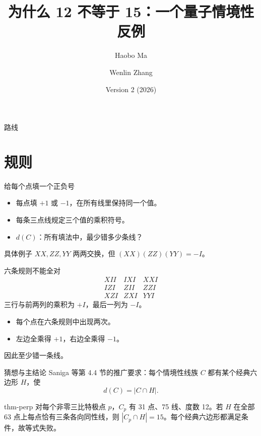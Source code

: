 \documentclass{beamer}
\title{为什么 12 不等于 15：一个量子情境性反例}
\author{Haobo Ma \and Wenlin Zhang}
\date{Version 2 (2026)}
\begin{document}
\begin{frame}
\titlepage
{}
\end{frame}
\begin{frame}{路线}
\tableofcontents
{}
\end{frame}
\section{规则}
\begin{frame}{给每个点填一个正负号}
\begin{itemize}
\item 每点填 $+1$ 或 $-1$，在所有线里保持同一个值。
\item 每条三点线规定三个值的乘积符号。
\item $d(C)$：所有填法中，最少错多少条线？
\end{itemize}
\begin{block}{具体例子}
$XX,ZZ,YY$ 两两交换，但 $(XX)(ZZ)(YY)=-I$。
\end{block}
\end{frame}
\begin{frame}{六条规则不能全对}
\[
\begin{array}{ccc}XII&IXI&XXI\\IZI&ZII&ZZI\\XZI&ZXI&YYI\end{array}
\]
三行与前两列的乘积为 $+I$，最后一列为 $-I$。
\begin{itemize}
\item 每个点在六条规则中出现两次。
\item 左边全乘得 $+1$，右边全乘得 $-1$。
\end{itemize}
因此至少错一条线。
\end{frame}
\begin{frame}{猜想与主结论}
Saniga 等第 4.4 节的推广要求：每个情境性线族 $C$ 都有某个经典六边形 $H$，使
\[d(C)=|C\cap H|.\]
\begin{bookresult}{thm-perp}
对每个非零三比特极点 $p$，$C_p$ 有 31 点、75 线、度数 12。若 $H$ 在全部 63 点上每点恰有三条各向同性线，则 $|C_p\cap H|=15$。每个经典六边形都满足条件，故等式失败。
\end{bookresult}
\end{frame}
\end{document}
